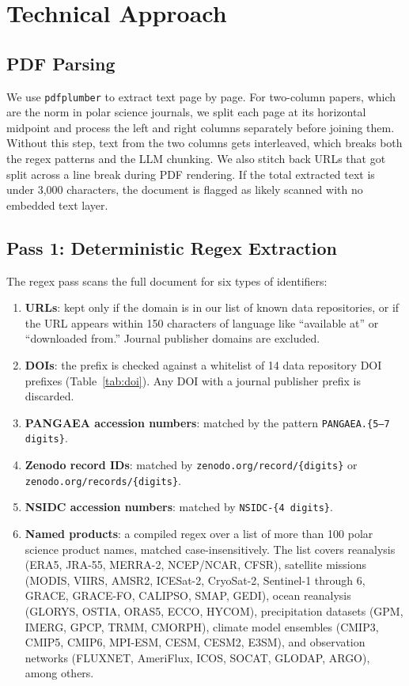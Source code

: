\documentclass[sigconf]{acmart}
\begin{document}
\section{Technical Approach}

\subsection{PDF Parsing}

We use \texttt{pdfplumber} \cite{pdfplumber} to extract text page by page. For
two-column papers, which are the norm in polar science journals, we split each page
at its horizontal midpoint and process the left and right columns separately before
joining them. Without this step, text from the two columns gets interleaved, which
breaks both the regex patterns and the LLM chunking. We also stitch back URLs that
got split across a line break during PDF rendering. If the total extracted text is
under 3,000 characters, the document is flagged as likely scanned with no embedded
text layer.

\subsection{Pass 1: Deterministic Regex Extraction}

The regex pass scans the full document for six types of identifiers:

\begin{enumerate}[noitemsep, topsep=2pt]
  \item \textbf{URLs}: kept only if the domain is in our list of known data
    repositories, or if the URL appears within 150 characters of language like
    ``available at'' or ``downloaded from.'' Journal publisher domains are excluded.
  \item \textbf{DOIs}: the prefix is checked against a whitelist of 14 data
    repository DOI prefixes (Table~\ref{tab:doi}). Any DOI with a journal publisher
    prefix is discarded.
  \item \textbf{PANGAEA accession numbers}: matched by the pattern
    \texttt{PANGAEA.\{5--7 digits\}}.
  \item \textbf{Zenodo record IDs}: matched by
    \texttt{zenodo.org/record/\{digits\}} or \texttt{zenodo.org/records/\{digits\}}.
  \item \textbf{NSIDC accession numbers}: matched by \texttt{NSIDC-\{4 digits\}}.
  \item \textbf{Named products}: a compiled regex over a list of more than 100
    polar science product names, matched case-insensitively. The list covers
    reanalysis (ERA5, JRA-55, MERRA-2, NCEP/NCAR, CFSR), satellite missions
    (MODIS, VIIRS, AMSR2, ICESat-2, CryoSat-2, Sentinel-1 through 6, GRACE,
    GRACE-FO, CALIPSO, SMAP, GEDI), ocean reanalysis (GLORYS, OSTIA, ORAS5,
    ECCO, HYCOM), precipitation datasets (GPM, IMERG, GPCP, TRMM, CMORPH),
    climate model ensembles (CMIP3, CMIP5, CMIP6, MPI-ESM, CESM, CESM2, E3SM),
    and observation networks (FLUXNET, AmeriFlux, ICOS, SOCAT, GLODAP, ARGO),
    among others.
\end{enumerate}
\end{document}
